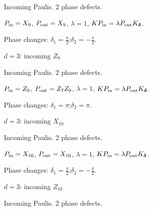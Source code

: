 Incoming Paulis. 2 phase defects.
\begin{center}
\end{center}
\vspace{-1mm}
$P_{\rm in}=X_{9}$, \quad $P_{\rm out}=X_{9}$, \quad $\lambda=1$, \qquad $K P_{\rm in}=\lambda P_{\rm out}K_{\boldsymbol\delta}$.
\par\smallskip\begin{minipage}{.98\linewidth}\small Phase changes: $\delta_{1}=\frac{\pi}{2}$;\quad $\delta_{2}=-\frac{\pi}{2}$.\end{minipage}
\vfill
{\footnotesize\texttt{}}
\newpage
{}
{\Large $d=3$: incoming $Z_{9}$}\par
Incoming Paulis. 2 phase defects.
\begin{center}
\end{center}
\vspace{-1mm}
$P_{\rm in}=Z_{9}$, \quad $P_{\rm out}=Z_{7}Z_{9}$, \quad $\lambda=1$, \qquad $K P_{\rm in}=\lambda P_{\rm out}K_{\boldsymbol\delta}$.
\par\smallskip\begin{minipage}{.98\linewidth}\small Phase changes: $\delta_{1}=\pi$;\quad $\delta_{2}=\pi$.\end{minipage}
\vfill
{\footnotesize\texttt{}}
\newpage
{}
{\Large $d=3$: incoming $X_{10}$}\par
Incoming Paulis. 2 phase defects.
\begin{center}
\end{center}
\vspace{-1mm}
$P_{\rm in}=X_{10}$, \quad $P_{\rm out}=X_{10}$, \quad $\lambda=1$, \qquad $K P_{\rm in}=\lambda P_{\rm out}K_{\boldsymbol\delta}$.
\par\smallskip\begin{minipage}{.98\linewidth}\small Phase changes: $\delta_{1}=\frac{\pi}{2}$;\quad $\delta_{2}=-\frac{\pi}{2}$.\end{minipage}
\vfill
{\footnotesize\texttt{}}
\newpage
{}
{\Large $d=3$: incoming $Z_{10}$}\par
Incoming Paulis. 2 phase defects.
\begin{center}
\end{center}
